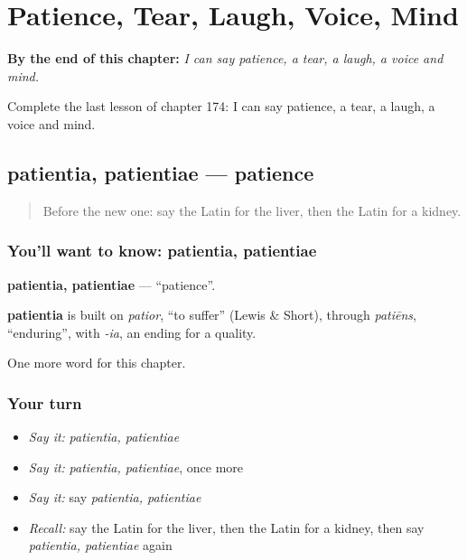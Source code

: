 
\chapter{Patience, Tear, Laugh, Voice, Mind}
\label{ch:la-patience-tear-laugh-voice-mind}

\begin{chapteropening}
\textbf{By the end of this chapter:} \emph{I can say patience, a tear, a laugh, a voice and mind.}

Complete the last lesson of chapter 174: I can say patience, a tear, a laugh, a voice and mind.
\end{chapteropening}

\section[patientia, patientiae]{patientia, patientiae — patience}

\label{lesson:LA-C174-patientia}



\begin{quote}
Before the new one: say the Latin for the liver, then the Latin for a kidney.
\end{quote}

\subsection*{You'll want to know: patientia, patientiae}
\textbf{patientia, patientiae} — \textquotedblleft{}patience\textquotedblright{}.

\begin{cousinweb}
\textbf{patientia} is built on \emph{patior}, \textquotedblleft{}to suffer\textquotedblright{} (Lewis \& Short), through \emph{patiēns}, \textquotedblleft{}enduring\textquotedblright{}, with \emph{-ia}, an ending for a quality.
\end{cousinweb}

\begin{grammarlens}[title={What you've built}]
One more word for this chapter.
\end{grammarlens}

\subsection*{Your turn}
\begin{itemize}
\raggedright
  \item \emph{Say it:} \emph{patientia, patientiae}
  \item \emph{Say it:} \emph{patientia, patientiae}, once more
  \item \emph{Say it:} say \emph{patientia, patientiae}
  \item \emph{Recall:} say the Latin for the liver, then the Latin for a kidney, then say \emph{patientia, patientiae} again
\end{itemize}

